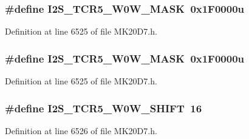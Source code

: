 \subsubsection[{\texorpdfstring{I2\+S\+\_\+\+T\+C\+R5\+\_\+\+W0\+W\+\_\+\+M\+A\+SK}{I2S_TCR5_W0W_MASK}}]{\setlength{\rightskip}{0pt plus 5cm}\#define I2\+S\+\_\+\+T\+C\+R5\+\_\+\+W0\+W\+\_\+\+M\+A\+SK~0x1\+F0000u}\hypertarget{group___i2_s___register___masks_ga8c6552a52f0e99068ae8869056e78ccb}{}\label{group___i2_s___register___masks_ga8c6552a52f0e99068ae8869056e78ccb}


Definition at line 6525 of file M\+K20\+D7.\+h.

\subsubsection[{\texorpdfstring{I2\+S\+\_\+\+T\+C\+R5\+\_\+\+W0\+W\+\_\+\+M\+A\+SK}{I2S_TCR5_W0W_MASK}}]{\setlength{\rightskip}{0pt plus 5cm}\#define I2\+S\+\_\+\+T\+C\+R5\+\_\+\+W0\+W\+\_\+\+M\+A\+SK~0x1\+F0000u}\hypertarget{group___i2_s___register___masks_ga8c6552a52f0e99068ae8869056e78ccb}{}\label{group___i2_s___register___masks_ga8c6552a52f0e99068ae8869056e78ccb}


Definition at line 6525 of file M\+K20\+D7.\+h.

\subsubsection[{\texorpdfstring{I2\+S\+\_\+\+T\+C\+R5\+\_\+\+W0\+W\+\_\+\+S\+H\+I\+FT}{I2S_TCR5_W0W_SHIFT}}]{\setlength{\rightskip}{0pt plus 5cm}\#define I2\+S\+\_\+\+T\+C\+R5\+\_\+\+W0\+W\+\_\+\+S\+H\+I\+FT~16}\hypertarget{group___i2_s___register___masks_ga0b9f1161cd97d2be7e9ee7f680293e3d}{}\label{group___i2_s___register___masks_ga0b9f1161cd97d2be7e9ee7f680293e3d}


Definition at line 6526 of file M\+K20\+D7.\+h.

